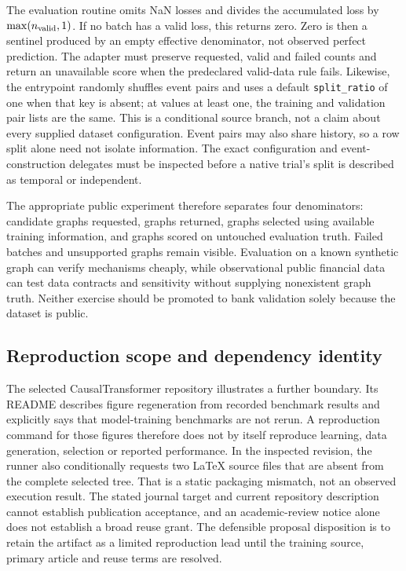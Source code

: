 The evaluation routine omits NaN losses and divides the accumulated loss by
$\max(n_{\rm valid},1)$. If no batch has a valid loss, this returns zero. Zero is then a
sentinel produced by an empty effective denominator, not observed perfect prediction. The adapter
must preserve requested, valid and failed counts and return an unavailable score when the
predeclared valid-data rule fails. Likewise, the entrypoint randomly shuffles event pairs and
uses a default \texttt{split\_ratio} of one when that key is absent; at values at least one,
the training and validation pair lists are the same. This is a conditional source branch,
not a claim about every supplied dataset configuration. Event pairs may also share history,
so a row split alone need not isolate information. The exact configuration and event-construction
delegates must be inspected before a native trial's split is described as temporal or independent.
\citep{exec28_at_tacd}

The appropriate public experiment therefore separates four denominators: candidate graphs
requested, graphs returned, graphs selected using available training information, and graphs
scored on untouched evaluation truth. Failed batches and unsupported graphs remain visible.
Evaluation on a known synthetic graph can verify mechanisms cheaply, while observational public
financial data can test data contracts and sensitivity without supplying nonexistent graph truth.
Neither exercise should be promoted to bank validation solely because the dataset is public.

\subsection{Reproduction scope and dependency identity}
The selected CausalTransformer repository illustrates a further boundary. Its README describes
figure regeneration from recorded benchmark results and explicitly says that model-training
benchmarks are not rerun. A reproduction command for those figures therefore does not by itself
reproduce learning, data generation, selection or reported performance. In the inspected revision,
the runner also conditionally requests two LaTeX source files that are absent from the complete
selected tree. That is a static packaging mismatch, not an observed execution result. The stated
journal target and current repository description cannot establish publication acceptance, and
an academic-review notice alone does not establish a broad reuse grant. The defensible proposal
disposition is to retain the artifact as a limited reproduction lead until the training source,
primary article and reuse terms are resolved.~\citep{exec28_at_ct}

